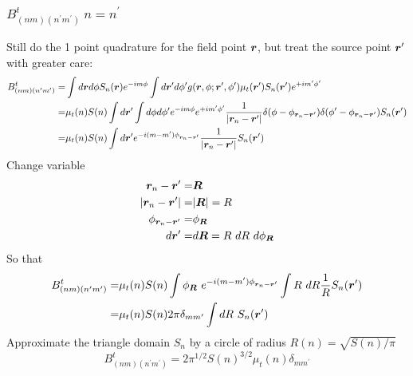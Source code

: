 \documentclass [10pt,letterpaper]{article}
\begin{document}
\subsubsection{$B^t_{(n m)(n^\prime m^\prime)} \ n=n^\prime$}
\label{subsub:Btnmnpmp-diagonal}
Still do the 1 point quadrature for the field point $\vectorsym{r}$, but treat the source point $\vectorsym{r}^\prime$ with greater care:
\begin{equation} \label{eq:der-Btnmnpmp-diagonal-1pt-1}
	\begin{split}
		B^t_{(n m)(n^\prime m^\prime)}
		=&
		\int d\vectorsym{r} d\phi
		S_n(\vectorsym{r})
		e^{-i m \phi}
		\int d\vectorsym{r}^\prime d\phi^\prime
		g(\vectorsym{r},\phi;\vectorsym{r}^\prime,\phi^\prime)
		\mu_t(\vectorsym{r}^\prime)
		S_n(\vectorsym{r}^\prime)
		e^{+i m^\prime \phi^\prime}
		\\
		=&
		\mu_t(n) S(n)
		\int d\vectorsym{r}^\prime
		\int d\phi d\phi^\prime
		e^{-i m \phi}
		e^{+i m^\prime \phi^\prime}
		\frac{1}{\lvert\vectorsym{r}_n-\vectorsym{r}^\prime\rvert}
		\delta(\phi-\phi_{\vectorsym{r}_n-\vectorsym{r}^\prime})
		\delta(\phi^\prime-\phi_{\vectorsym{r}_n-\vectorsym{r}^\prime})
		S_n(\vectorsym{r}^\prime)
		\\
		=&
		\mu_t(n) S(n)
		\int d\vectorsym{r}^\prime
		e^{-i (m-m^\prime) \phi_{\vectorsym{r}_n-\vectorsym{r}^\prime}}
		\frac{1}{\lvert\vectorsym{r}_n-\vectorsym{r}^\prime\rvert}
		S_n(\vectorsym{r}^\prime)
	\end{split}
\end{equation}
Change variable
\begin{equation} \label{eq:der-change-variable}
	\begin{split}
		\vectorsym{r}_n-\vectorsym{r}^\prime
		=&
		\vectorsym{R}
		\\
		\lvert \vectorsym{r}_n-\vectorsym{r}^\prime \rvert 
		=&
		\lvert \vectorsym{R} \rvert = R
		\\
		\phi_{\vectorsym{r}_n-\vectorsym{r}^\prime}
		=&
		\phi_{\vectorsym{R}}
		\\
		d\vectorsym{r}^\prime
		=&
		d\vectorsym{R}=R\ dR\ d\phi_{\vectorsym{R}}
	\end{split}
\end{equation}
So that
\begin{equation} \label{eq:der-Btnmnpmp-diagonal-1pt-2}
	\begin{split}
		B^t_{(n m)(n^\prime m^\prime)}
		=& 
		\mu_t(n) S(n)
		\int \phi_{\vectorsym{R}}\ 
		e^{-i (m-m^\prime) \phi_{\vectorsym{r}_n-\vectorsym{r}^\prime}}
		\int R\ dR 
		\frac{1}{R}
		S_n(\vectorsym{r}^\prime)
		\\
		=&
		\mu_t(n) S(n)
		2\pi 
		\delta_{m m^\prime}
		\int dR\  
		S_n(\vectorsym{r}^\prime)
	\end{split}
\end{equation}
Approximate the triangle domain $S_n$ by a circle of radius $R(n)=\sqrt{S(n)/\pi}$
\begin{equation} \label{eq:result-Btnmnpmp-diagonal-1pt}
	B^t_{(n m)(n^\prime m^\prime)}
	=
	2 
	\pi^{1/2}
	S(n)^{3/2}
	\mu_t(n) 
	\delta_{m m^\prime}
\end{equation}
\end{document}
